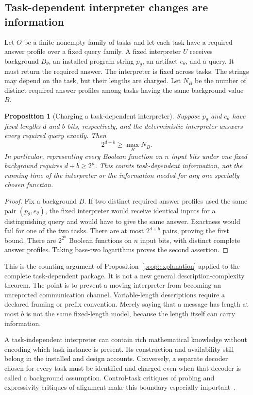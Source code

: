 \documentclass[11pt,letterpaper]{article}
\theoremstyle{plain}
\newtheorem{proposition}[theorem]{Proposition}
\theoremstyle{definition}
\begin{document}
\subsection{Task-dependent interpreter changes are information}
Let $\Theta$ be a finite nonempty family of tasks and let each task have a required answer profile over a fixed query family. A fixed interpreter $U$ receives background $B_\theta$, an installed program string $p_\theta$, an artifact $e_\theta$, and a query. It must return the required answer. The interpreter is fixed across tasks. The strings may depend on the task, but their lengths are charged. Let $N_B$ be the number of distinct required answer profiles among tasks having the same background value $B$.

\begin{proposition}[Charging a task-dependent interpreter]\label{prop:advice}
Suppose $p_\theta$ and $e_\theta$ have fixed lengths $d$ and $b$ bits, respectively, and the deterministic interpreter answers every required query exactly. Then
\[
2^{d+b}\geq\max_B N_B.
\]
In particular, representing every Boolean function on $n$ input bits under one fixed background requires $d+b\geq2^n$. This counts task-dependent information, not the running time of the interpreter or the information needed for any one specially chosen function.
\end{proposition}
\begin{proof}
Fix a background $B$. If two distinct required answer profiles used the same pair $(p_\theta,e_\theta)$, the fixed interpreter would receive identical inputs for a distinguishing query and would have to give the same answer. Exactness would fail for one of the two tasks. There are at most $2^{d+b}$ pairs, proving the first bound. There are $2^{2^n}$ Boolean functions on $n$ input bits, with distinct complete answer profiles. Taking base-two logarithms proves the second assertion.
\end{proof}

This is the counting argument of Proposition~\ref{prop:explanation} applied to the complete task-dependent package. It is not a new general description-complexity theorem. The point is to prevent a moving interpreter from becoming an unreported communication channel. Variable-length descriptions require a declared framing or prefix convention. Merely saying that a message has length at most $b$ is not the same fixed-length model, because the length itself can carry information.

A task-independent interpreter can contain rich mathematical knowledge without encoding which task instance is present. Its construction and availability still belong in the installed and design accounts. Conversely, a separate decoder chosen for every task must be identified and charged even when that decoder is called a background assumption. Control-task critiques of probing and expressivity critiques of alignment make this boundary especially important~\cite{hewitt,sutter}.
\end{document}
